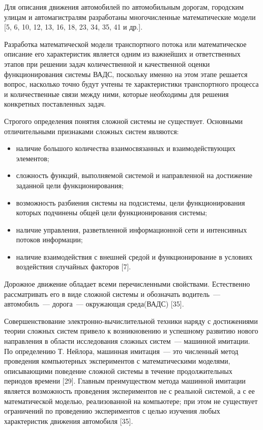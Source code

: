 \documentclass[a4paper,14pt]{article}
\begin{document}
Для описания движения автомобилей по автомобильным дорогам, городским улицам и автомагистралям разработаны многочисленные математические модели [5, 6, 10, 12, 13, 16, 18, 23, 34, 35, 41 и др.].

Разработка математической модели транспортного потока или математическое описание его характеристик является одним из важнейших и ответственных этапов при решении задач количественной и качественной оценки функционирования системы ВАДС, поскольку именно на этом этапе решается вопрос, насколько точно будут учтены те характеристики транспортного процесса и количественные связи между ними, которые необходимы для решения конкретных поставленных задач.

Строгого определения понятия сложной системы не существует. Основными отличительными признаками сложных систем являются:
\begin{itemize}
\item наличие большого количества взаимосвязанных и взаимодействующих элементов;
\item сложность функций, выполняемой системой и направленной на достижение заданной цели функционирования;
\item возможность разбиения системы на подсистемы, цели функционирования которых подчинены общей цели функционирования системы;
\item наличие управления, разветвленной информационной сети и интенсивных потоков информации;
\item наличие взаимодействия с внешней средой и функционирование в условиях воздействия случайных факторов [7].
\end{itemize}

Дорожное движение обладает всеми перечисленными свойствами. Естественно рассматривать его в виде сложной системы и обозначать \glqq водитель~--- автомобиль~--- дорога~--- окружающая среда\grqq (ВАДС) [35].

Совершенствование электронно-вычислительной техники наряду с достижениями теории сложных систем привело к возникновению и успешному развитию нового направления в области исследования сложных систем~--- машинной имитации. По определению Т. Нейлора, машинная имитация~--- это численный метод проведения компьютерных экспериментов с математическими моделями, описывающими поведение сложной системы в течение продолжительных периодов времени [29]. Главным преимуществом метода машинной имитации является возможность проведения экспериментов не с реальной системой, а с ее математической моделью, реализованной на компьютере; при этом не существует ограничений по проведению экспериментов с целью изучения любых характеристик движения автомобиля [35].
\end{document}
